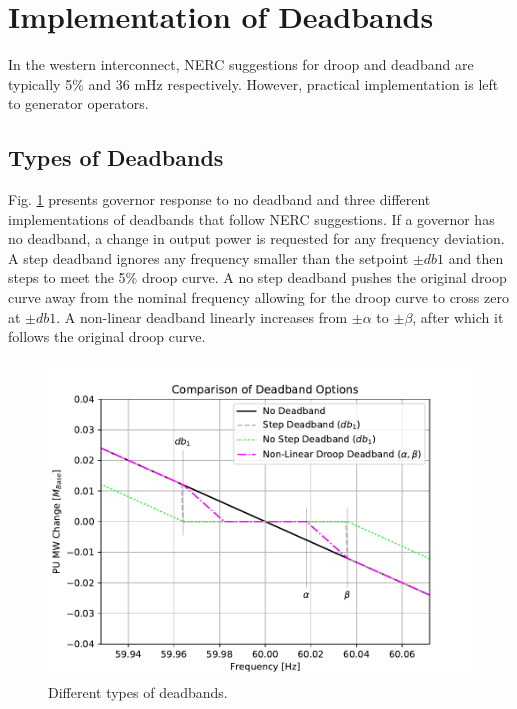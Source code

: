 \section{Implementation of Deadbands}
In the western interconnect, NERC suggestions for droop and deadband are typically 5\% and 36 mHz respectively.
However, practical implementation is left to generator operators.

\subsection{Types of Deadbands}
Fig. \ref{fig: deadbandType} presents governor response to no deadband and three different implementations of deadbands that follow NERC suggestions.
If a governor has no deadband, a change in output power is requested for any frequency deviation.
A step deadband ignores any frequency smaller than the setpoint $\pm db1$ and then steps to meet the 5\% droop curve.
A no step deadband pushes the original droop curve away from the nominal frequency allowing for the droop curve to cross zero at $\pm db1$.
A non-linear deadband linearly increases from $\pm \alpha$ to $\pm \beta$, after which it follows the original droop curve.
\begin{figure}[!ht]
	\centering
	\includegraphics[width=\linewidth]{figures/dbAction3}
	\caption{Different types of deadbands.}
	\label{fig: deadbandType}
\end{figure}